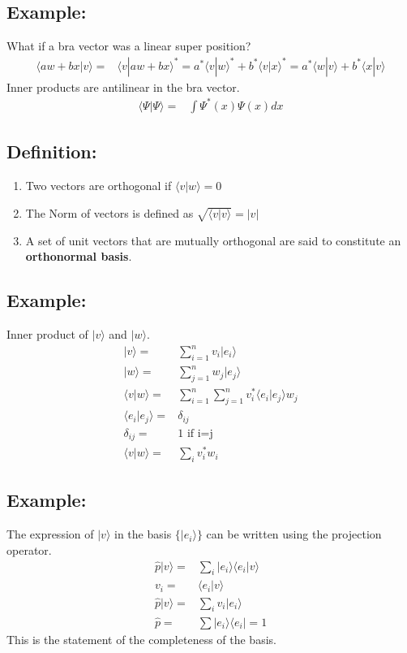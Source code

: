 \documentclass[12pt]{article}
\begin{document}
\subsection*{Example:}
What if a bra vector was a linear super position?
\begin{align*}
\langle aw + bx|v\rangle =& \langle v |aw + bx\rangle^*
= a^*\langle v|w\rangle^* + b^*\langle v|x\rangle^*
= \boxed{a^*\langle w|v\rangle + b^*\langle x|v\rangle}
\end{align*}
Inner products are antilinear in the bra vector.
\begin{align*}
\langle \Psi|\Psi \rangle =& \int \Psi^*(x)\Psi(x) dx
\end{align*}

\subsection*{Definition:}
\begin{enumerate}
\item Two vectors are orthogonal if $\langle v|w \rangle = 0$
\item The Norm of vectors is defined as $\sqrt{\langle v|v \rangle} = |v|$
\item A set of unit vectors that are mutually orthogonal are said to constitute an \textbf{orthonormal basis}.
\end{enumerate}

\subsection*{Example:}
Inner product of $|v\rangle$ and $|w\rangle$. 
\begin{align*}
|v\rangle =& \sum_{i=1}^n v_i |e_i\rangle
\\
|w\rangle =& \sum_{j=1}^n w_j |e_j\rangle
\\
\langle v|w \rangle =& \sum_{i=1}^n \sum_{j=1}^n v_i^*\langle e_i|e_j \rangle w_j
\\
\langle e_i|e_j \rangle =& \delta_{ij}
\\
\delta_{ij} =& 1 \text{  if i=j}
\\
\langle v|w \rangle =& \sum_i v_i^*w_i
\end{align*}

\subsection*{Example:}
The expression of $|v\rangle$ in the basis $\lbrace |e_i \rangle\rbrace$ can be written using the projection operator.
\begin{align*}
\hat{p} |v\rangle =& \sum_i |e_i\rangle\langle e_i|v\rangle  
\\
v_i =& \langle e_i |v\rangle
\\
\hat{p} |v\rangle =& \sum_i v_i|e_i \rangle 
\\
\hat{p} =& \sum |e_i\rangle\langle e_i| = 1
\end{align*}
This is the statement of the completeness of the basis.
\end{document}
